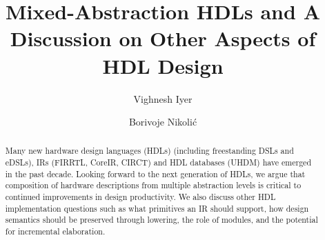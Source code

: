 \documentclass[sigplan,review,nonacm,10pt]{acmart}
\begin{document}
\title{Mixed-Abstraction HDLs and A Discussion on Other Aspects of HDL Design}


\author{Vighnesh Iyer}

\author{Borivoje Nikolić}




\begin{abstract}

Many new hardware design languages (HDLs) (including freestanding DSLs and eDSLs), IRs (FIRRTL, CoreIR, CIRCT) and HDL databases (UHDM) have emerged in the past decade.
Looking forward to the next generation of HDLs, we argue that composition of hardware descriptions from multiple abstraction levels is critical to continued improvements in design productivity.
We also discuss other HDL implementation questions such as what primitives an IR should support, how design semantics should be preserved through lowering, the role of modules, and the potential for incremental elaboration.
\end{abstract}
\end{document}
